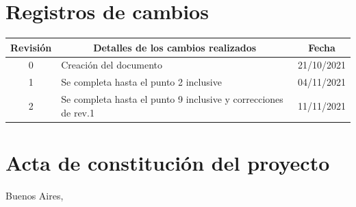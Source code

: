 \documentclass[
11pt, %
codirector, %
]{charter}
\begin{document}
\maketitle
\thispagestyle{empty}
\pagebreak


\thispagestyle{empty}
{\setlength{\parskip}{0pt}
\tableofcontents{}
}
\pagebreak


\section*{Registros de cambios}
\label{sec:registro}


\begin{table}[ht]
\label{tab:registro}
\centering
\begin{tabularx}{\linewidth}{@{}|c|X|c|@{}}
\hline
\rowcolor[HTML]{C0C0C0} 
Revisión & \multicolumn{1}{c|}{\cellcolor[HTML]{C0C0C0}Detalles de los cambios realizados} & Fecha      \\ \hline
0      & Creación del documento                                 & 21/10/2021 \\ \hline %
1      & Se completa hasta el punto 2 inclusive                 & 04/11/2021 \\ \hline
2      & Se completa hasta el punto 9 inclusive y correcciones de rev.1	& 11/11/2021 \\ \hline
\end{tabularx}
\end{table}

\pagebreak



\section*{Acta de constitución del proyecto}
\label{sec:acta}

\begin{flushright}
Buenos Aires, \fechaInicioName
\end{flushright}
\end{document}
